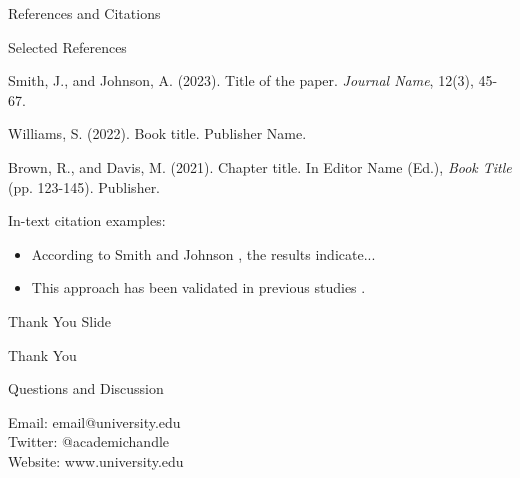 \documentclass[aspectratio=169]{beamer}
\begin{document}
\begin{frame}[fragile]{References and Citations}
  \begin{block}{Selected References}
    \footnotesize
    \begin{thebibliography}{9}
       Smith, J., and Johnson, A. (2023). Title of the paper. \textit{Journal Name}, 12(3), 45-67.
      
       Williams, S. (2022). Book title. Publisher Name.
      
       Brown, R., and Davis, M. (2021). Chapter title. In Editor Name (Ed.), \textit{Book Title} (pp. 123-145). Publisher.
    \end{thebibliography}
  \end{block}
  
  In-text citation examples:
  \begin{itemize}
    \item According to Smith and Johnson \cite{ref1}, the results indicate...
    \item This approach has been validated in previous studies \cite{ref2, ref3}.
  \end{itemize}
\end{frame}

\begin{frame}{Thank You Slide}
  \begin{center}
    \vspace{1cm}
    {\Large Thank You}
    
    \vspace{0.5cm}
    {\large Questions and Discussion}
    
    \vspace{1.5cm}
    {\small
    Email: email@university.edu\\
    \vspace{0.2cm}
    Twitter: @academichandle\\
    Website: www.university.edu}
  \end{center}
\end{frame}

\appendix
\end{document}
